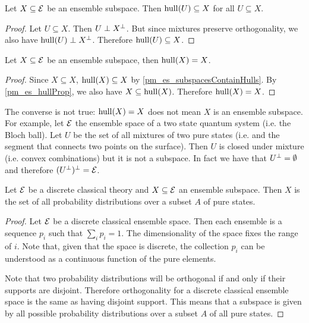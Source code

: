 \begin{prop}\label{pm_es_subspacesContainHulls}
	Let $X \subseteq \mathcal{E}$ be an ensemble subspace. Then $\mathrm{hull}(U) \subseteq X$ for all $U \subseteq X$.
\end{prop}

\begin{proof}
	Let $U \subseteq X$. Then $U \perp X^{\perp}$. But since mixtures preserve orthogonality, we also have $\mathrm{hull}(U) \perp X^{\perp}$. Therefore $\mathrm{hull}(U) \subseteq X$.
\end{proof}

\begin{coro}
	Let $X \subseteq \mathcal{E}$ be an ensemble subspace, then $\mathrm{hull}(X) = X$.
\end{coro}

\begin{proof}
	Since $X \subseteq X$, $\mathrm{hull}(X) \subseteq X$ by \ref{pm_es_subspacesContainHulls}. By \ref{pm_es_hullProp}, we also have $X \subseteq \mathrm{hull}(X)$. Therefore $\mathrm{hull}(X) = X$.
\end{proof}

\begin{remark}
	The converse is not true: $\mathrm{hull}(X) = X$ does not mean $X$ is an ensemble subspace. For example, let $\mathcal{E}$ the ensemble space of a two state quantum system (i.e. the Bloch ball). Let $U$ be the set of all mixtures of two pure states (i.e. and the segment that connects two points on the surface). Then $U$ is closed under mixture (i.e. convex combinations) but it is not a subspace. In fact we have that $U^{\perp}=\emptyset$ and therefore $(U^\perp)^\perp = \mathcal{E}$.
\end{remark}

\begin{prop}
	Let $\mathcal{E}$ be a discrete classical theory and $X \subseteq \mathcal{E}$ an ensemble subspace. Then $X$ is the set of all probability distributions over a subset $A$ of pure states.
\end{prop}

\begin{proof}
	Let $\mathcal{E}$ be a discrete classical ensemble space. Then each ensemble is a sequence $p_i$ such that $\sum_i p_i = 1$. The dimensionality of the space fixes the range of $i$. Note that, given that the space is discrete, the collection $p_i$ can be understood as a continuous function of the pure elements.
	
	Note that two probability distributions will be orthogonal if and only if their supports are disjoint. Therefore orthogonality for a discrete classical ensemble space is the same as having disjoint support. This means that a subspace is given by all possible probability distributions over a subset $A$ of all pure states.
\end{proof}

